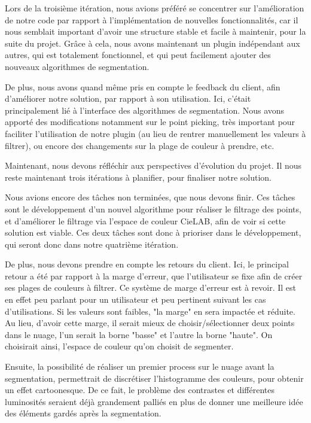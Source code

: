 \documentclass[12pt,titlepage,french]{article}
\begin{document}
Lors de la troisième itération, nous avions préféré se concentrer sur l'amélioration de notre code par rapport à l'implémentation de nouvelles fonctionnalités, car il nous semblait important d'avoir une structure stable et facile à maintenir, pour la suite du projet. Grâce à cela, nous avons maintenant un plugin indépendant aux autres, qui est totalement fonctionnel, et qui peut facilement ajouter des nouveaux algorithmes de segmentation. 

De plus, nous avons quand même pris en compte le feedback du client, afin d'améliorer notre solution, par rapport à son utilisation. Ici, c'était principalement lié à l'interface des algorithmes de segmentation. Nous avons apporté des modifications notamment sur le point picking, très important pour faciliter l'utilisation de notre plugin (au lieu de rentrer manuellement les valeurs à filtrer), ou encore des changements sur la plage de couleur à prendre, etc. \newline

Maintenant, nous devons réfléchir aux perspectives d'évolution du projet. Il nous reste maintenant trois itérations à planifier, pour finaliser notre solution. \newline

Nous avions encore des tâches non terminées, que nous devons finir. Ces tâches sont le développement d'un nouvel algorithme pour réaliser le filtrage des points, et d'améliorer le filtrage via l'espace de couleur CieLAB, afin de voir si cette solution est viable. Ces deux tâches sont donc à prioriser dans le développement, qui seront donc dans notre quatrième itération.

De plus, nous devons prendre en compte les retours du client. Ici, le principal retour a été par rapport à la marge d'erreur, que l'utilisateur se fixe afin de créer ses plages de couleurs à filtrer. Ce système de marge d'erreur est à revoir. Il est en effet peu parlant pour un utilisateur et peu pertinent suivant les cas d'utilisations. Si les valeurs sont faibles, "la marge" en sera impactée et réduite. Au lieu, d'avoir cette marge, il serait mieux de choisir/sélectionner deux points dans le nuage, l'un serait la borne "basse" et l'autre la borne "haute". On choisirait ainsi, l'espace de couleur qu'on choisit de segmenter.

Ensuite, la possibilité de réaliser un premier process sur le nuage avant la segmentation, permettrait de discrétiser l'histogramme des couleurs, pour obtenir un effet cartoonesque. De ce fait, le problème des contrastes et différentes luminosités seraient déjà grandement palliés en plus de donner une meilleure idée des éléments gardés après la segmentation.
\end{document}

